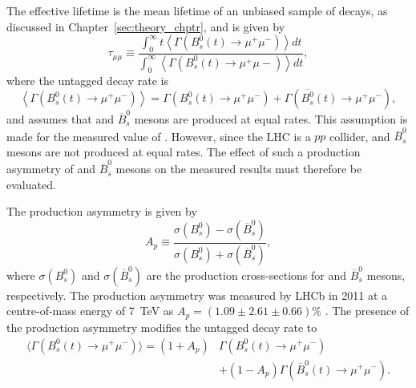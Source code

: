 The \bsmumu effective lifetime is the mean lifetime of an unbiased sample of \bsmumu decays, as discussed in Chapter~\ref{sec:theory_chptr}, and is given by
\begin{equation}
 \tau_{\mu\mu} \equiv \frac{\int^\infty_0 t \left<\Gamma \left( B^{0}_s(t) \rightarrow \mu^{+} \mu^{-} \right) \right> dt }{\int^\infty_0 \left<\Gamma \left( B^{0}_s(t) \rightarrow \mu^{+} \mu{-} \right) \right> dt },
\label{eq:el}
\end{equation}
where the untagged decay rate is
\begin{equation}
\left< \Gamma \left( B^0_s(t) \rightarrow \mu^{+} \mu^{-} \right)\right>  = \Gamma \left ( B^0_s(t) \rightarrow \mu^{+}\mu^{-} \right) + \Gamma \left ( \overline{B^0_s}(t) \rightarrow \mu^{+} \mu^{-} \right),
\end{equation}
and assumes that \bs and $\overline{B}^{0}_{s}$ mesons are produced at equal rates. This assumption is made for the measured value of \tmumu. However, since the LHC is a $pp$ collider, \bs and $\overline{B}^{0}_{s}$ mesons are not produced at equal rates. The effect of such a production asymmetry of \bs and $\overline{B}^{0}_{s}$ mesons on the measured results must therefore be evaluated. 

The production asymmetry is given by 
\begin{equation}
 A_{p} \equiv \frac{\sigma\left(B^{0}_{s}\right) - \sigma\left(\overline{B}^{0}_{s}\right)}{\sigma\left(B^{0}_{s}\right) + \sigma\left(\overline{B}^{0}_{s}\right)},
\label{eq:Ap}
\end{equation}
where $\sigma\left(B^{0}_{s}\right)$ and $\sigma\left(\overline{B}^{0}_{s}\right)$ are the production cross-sections for \bs and $\overline{B}^{0}_{s}$ mesons, respectively. The production asymmetry was measured by LHCb in 2011 at a centre-of-mass energy of 7~TeV as $ A_{p} = (1.09 \pm 2.61 \pm 0.66) \%$ \cite{Aaij:2014bba}. The presence of the production asymmetry modifies the untagged \bsmumu decay rate to
\begin{align}
\langle \Gamma\left( B^0_s(t) \rightarrow \mu^{+}\mu^{-}\right) \rangle= (1+A_p)&\Gamma(B^0_s(t)\rightarrow \mu^{+} \mu^{-}) \nonumber \\
&  + (1-A_p)\Gamma(\overline{B}^0_s(t)\rightarrow \mu^{+} \mu^{-}).
\label{eq:modifieddecayrate}
\end{align}

